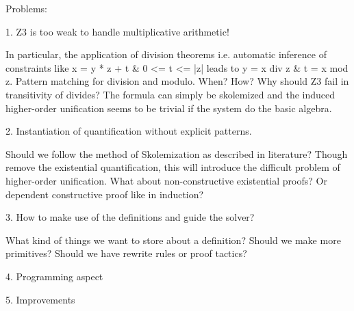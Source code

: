\documentclass{article}
\begin{document}
Problems:

1. Z3 is too weak to handle multiplicative arithmetic!

In particular, the application of division theorems i.e. automatic inference of constraints like x = y * z + t \& 0 <= t <= |z| leads to y = x div z \& t = x mod z.
Pattern matching for division and modulo. When? How?   
Why should Z3 fail in transitivity of divides?
The formula can simply be skolemized and the induced higher-order unification seems to be trivial if the system do the basic algebra.

2. Instantiation of quantification without explicit patterns.

Should we follow the method of Skolemization as described in literature? Though remove the existential quantification, this will introduce the difficult problem of higher-order unification.
What about non-constructive existential proofs? Or dependent constructive proof like in induction?
 
3. How to make use of the definitions and guide the solver?

What kind of things we want to store about a definition?
Should we make more primitives?
Should we have rewrite rules or proof tactics?

4. Programming aspect

5. Improvements
\end{document}
